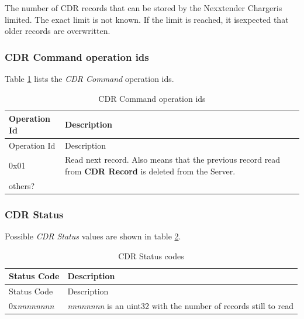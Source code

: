 \documentclass[a4paper]{article}
\begin{document}
The number of CDR records that can be stored by the Nexxtender Chargeris limited. 
The exact limit is not known. 
If the limit is reached, it isexpected that older records are overwritten.

\subsubsection{CDR Command operation ids}
\label{cdr_command_operation_ids}

Table \ref{table.55} lists the \emph{CDR Command} operation id\textquotesingle s.

\begin{longtable}[]{@{}lp{14cm}@{}}
	\caption{CDR Command operation ids}
	\label{table.55}
	\tabularnewline
	\toprule\noalign{}
	Operation Id & Description                                                    \\
	\midrule\noalign{}
	\endfirsthead
	\toprule\noalign{}
	Operation Id & Description                                                    \\
	\midrule\noalign{}
	\endhead
	\bottomrule\noalign{}
	\endlastfoot
	0x01         & Read next record. Also means that the previous record 
	read from \textbf{CDR Record} is deleted from the Server. \\
	others?      &                                                                \\
\end{longtable}

\subsubsection{CDR Status}
\label{cdr_status_status}

Possible \emph{CDR Status} values are shown in table \ref{table.56}.

\begin{longtable}[]{@{}ll@{}}
	\caption{CDR Status codes}
	\label{table.56}
	\tabularnewline
	\toprule\noalign{}
	Status Code       & Description                                     \\
	\midrule\noalign{}
	\endfirsthead
	\toprule\noalign{}
	Status Code       & Description                                     \\
	\midrule\noalign{}
	\endhead
	\bottomrule\noalign{}
	\endlastfoot
	0x\emph{nnnnnnnn} & \emph{nnnnnnnn} is an uint32 with the number of 
	records still to read \\
\end{longtable}
\end{document}
